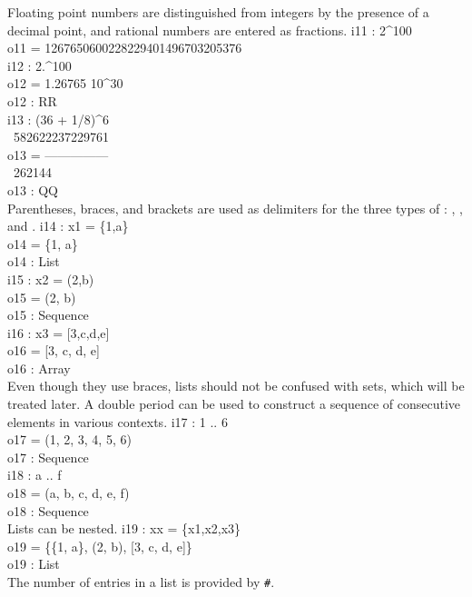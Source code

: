 Floating point numbers are distinguished from integers by the presence of a
decimal point, and rational numbers are entered as fractions.
\beginOutput
i11 : 2^100\\
\emptyLine
o11 = 1267650600228229401496703205376\\
\endOutput
\beginOutput
i12 : 2.^100\\
\emptyLine
o12 = 1.26765 10^30\\
\emptyLine
o12 : RR\\
\endOutput
\beginOutput
i13 : (36 + 1/8)^6\\
\emptyLine
\      582622237229761\\
o13 = ---------------\\
\           262144\\
\emptyLine
o13 : QQ\\
\endOutput
Parentheses, braces, and brackets are used as delimiters for the three types
of {\em {}}: , , and .
\beginOutput
i14 : x1 = \{1,a\}\\
\emptyLine
o14 = \{1, a\}\\
\emptyLine
o14 : List\\
\endOutput
\beginOutput
i15 : x2 = (2,b)\\
\emptyLine
o15 = (2, b)\\
\emptyLine
o15 : Sequence\\
\endOutput
\beginOutput
i16 : x3 = [3,c,d,e]\\
\emptyLine
o16 = [3, c, d, e]\\
\emptyLine
o16 : Array\\
\endOutput
Even though they use braces, lists should not be confused with sets, which will be treated later.
A double period can be used to construct a sequence of consecutive elements in various contexts.
\beginOutput
i17 : 1 .. 6\\
\emptyLine
o17 = (1, 2, 3, 4, 5, 6)\\
\emptyLine
o17 : Sequence\\
\endOutput
\beginOutput
i18 : a .. f\\
\emptyLine
o18 = (a, b, c, d, e, f)\\
\emptyLine
o18 : Sequence\\
\endOutput
Lists can be nested.
\beginOutput
i19 : xx = \{x1,x2,x3\}\\
\emptyLine
o19 = \{\{1, a\}, (2, b), [3, c, d, e]\}\\
\emptyLine
o19 : List\\
\endOutput
The number of entries in a list is provided by {\tt \#}.
